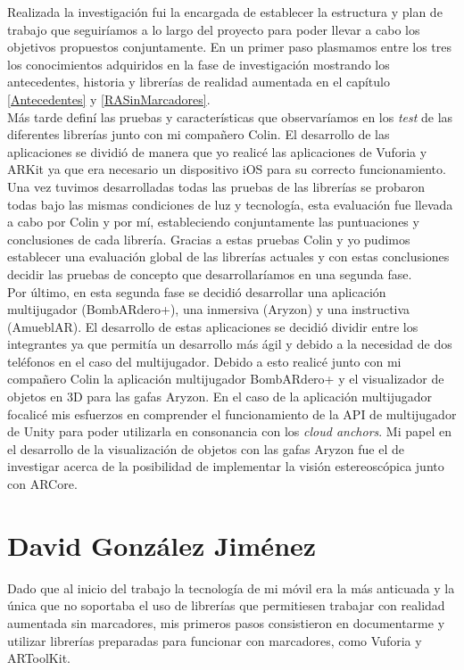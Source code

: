 Realizada la investigación fui la encargada de establecer la estructura y plan de trabajo que seguiríamos a lo largo del proyecto para poder llevar a cabo los objetivos propuestos conjuntamente. En un primer paso plasmamos entre los tres los conocimientos adquiridos en la fase de investigación mostrando los antecedentes, historia y librerías de realidad aumentada en el capítulo \ref{Antecedentes} y \ref{RASinMarcadores}.\\

Más tarde definí las pruebas y características que observaríamos en los \textit{test} de las diferentes librerías junto con mi compañero Colin. El desarrollo de las aplicaciones se dividió de manera que yo realicé las aplicaciones de Vuforia y ARKit ya que era necesario un dispositivo iOS para su correcto funcionamiento. Una vez tuvimos desarrolladas todas las pruebas de las librerías se probaron todas bajo las mismas condiciones de luz y tecnología, esta evaluación fue llevada a cabo por Colin y por mí, estableciendo conjuntamente las puntuaciones y conclusiones de cada librería. Gracias a estas pruebas Colin y yo pudimos establecer una evaluación global de las librerías actuales y con estas conclusiones decidir las pruebas de concepto que desarrollaríamos en una segunda fase.\\

Por último, en esta segunda fase se decidió desarrollar una aplicación multijugador (BombARdero+), una inmersiva (Aryzon) y una instructiva (AmueblAR). El desarrollo de estas aplicaciones se decidió dividir entre los integrantes ya que permitía un desarrollo más ágil y debido a la necesidad de dos teléfonos en el caso del multijugador. Debido a esto realicé junto con mi compañero Colin la aplicación multijugador BombARdero+ y el visualizador de objetos en 3D para las gafas Aryzon. En el caso de la aplicación multijugador focalicé mis esfuerzos en comprender el funcionamiento de la API de multijugador de Unity para poder utilizarla en consonancia con los \textit{cloud anchors}. Mi papel en el desarrollo de la visualización de objetos con las gafas Aryzon fue el de investigar acerca de la posibilidad de implementar la visión estereoscópica junto con ARCore.

\section{David González Jiménez}

Dado que al inicio del trabajo la tecnología de mi móvil era la más anticuada y la única que no soportaba el uso de librerías que permitiesen trabajar con realidad aumentada sin marcadores, mis primeros pasos consistieron en documentarme y utilizar librerías preparadas para funcionar con marcadores, como Vuforia y ARToolKit.\\

